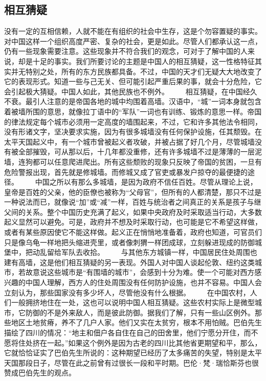 \documentclass[12pt,oneside]{book}
\begin{document}
\begin{common-format}
\chapter{相互猜疑}
没有一定的互相信赖，人就不能在有组织的社会中生存，这是个勿容置疑的事实。对中国这样一个组织高度严密、复杂的社会，更是如此。尽管人们都承认这一点，仍有一些现象需要注意。这些现象并不符合我们的观念，可对于了解中国的人来说，却是十足的事实。我们所要讨论的主题是中国人的相互猜疑，这一性格特征其实并无特别之处，所有的东方民族都具备。不过，中国的天才们无疑大大地改变了它的表现形式。知道一些与己无关、但可能引起严重后果的事，就会十分危险，它会引起极大猜疑。中国人如此，其他民族也不例外。 
　　相互猜疑，在中国经久不衰。最引人注意的是帝国各地的城中均围着高墙。汉语中，“城”一词本身就包含着被墙所围的意思，就像拉丁语中的“军队”一词也有训练、锻炼的意思一样。帝国的律法规定每个城市必须用一定高度的墙围起来，不过，它和许多其他法令相同，没有形诸文字，坚决要求实施，因为有很多城墙没有任何保护设施，任其颓毁。在太平天国起义中，有一个城市曾被起义者攻破，并被占据了好几个月，尽管城墙没有被全部摧毁，可从那以后，十几年都没重修，还有许多城墙不过是薄薄的一层泥墙，连狗都可以任意爬进爬出。所有这些颓败的现象只反映了帝国的贫困，一旦有危险警报出现，首先就是修城墙。而修城又成了官吏或暴发户掠夺的最便捷的途径。 
　　中国之所以有那么多城墙，是因为政府不信任百姓。尽管从理论上说，皇帝是百姓的父亲，他的臣僚也被称为“父母官”，但所有的人都清楚，那只不过是一种说法而已，就像说“加”或“减”一样，百姓与统治者之间真正的关系是孩子与继父间的关系。整个中国历史充满了起义，如果中央政府及时采取适当行动，大多数起义显然可以避免。可是，政府并不想及时采取行动，也可能是它不希望这样做，或者有某些原因使它不能这样做。起义正在悄悄地准备着，政府也知道，可官员们只是像乌龟一样地把头缩进壳里，或者像刺猬一样团成球，立刻躲进现成的防御城堡中，把动乱留给军队去收拾。 
　　与其他东方城镇一样，中国居民住处周围也建有高墙，这是他们相互猜疑的另一表现。外国人对中国人谈起伦敦、纽约这类城市，若故意说这些城市是“有围墙的城市”，会感到十分为难。使一个可能对西方感兴趣的中国人理解，西方人的住处周围没有任何防护设施，也并不容易。中国人会立刻认为，那些国家没有多少坏人，尽管他没有什么根据。 
　　在中国农村，人们一般拥挤地住在一处，这也可以说明中国人相互猜疑。这些农村实际上是微型城市，它防御的不是外来敌人，而是彼此防御。据我们了解，只有一些山区例外。那些地区土地贫瘠，养不了几户人家。他们又实在太贫穷，根本不用怕贼。巴伯先生描绘了四川的情况：“地主和佃户各自住在自己的田舍里，他们宁愿分开住，而不愿将住处挤在一起。”如果这个例外是因为古老的四川比其他省更期望和平，那么，它就恰恰证实了巴伯先生所说的：这种期望已经历了太多痛苦的失望，特别是太平天国那段日子，尽管在此之前曾有过很长一段和平时期。巴伦·梵·瑞恰斯芬也很赞成巴伯先生的观点。 

\end{common-format}
\end{document}

